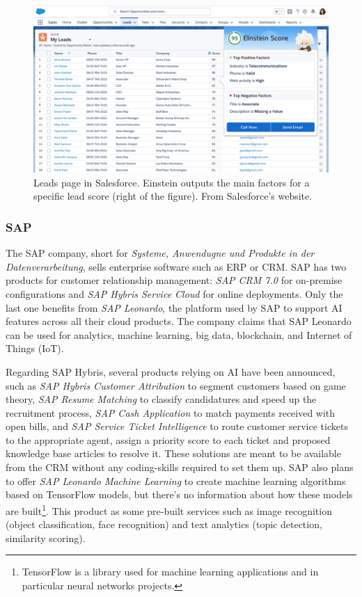 \begin{figure}[h]
    \centering
    \includegraphics[width=13cm]{images/s1.png}
    \caption[Salesforce Einstein for leads scores]{Leads page in Salesforce. Einstein outputs the main factors for a specific lead score (right of the figure). From Salesforce's website.}
    \label{fig:salesforce-leads}
\end{figure}

\subsubsection*{SAP}
The SAP company, short for \textit{Systeme, Anwendugne und Produkte in der Datenverarbeitung}, sells enterprise software such as ERP or CRM. SAP has two products for customer relationship management: \textit{SAP CRM 7.0} for on-premise configurations and \textit{SAP Hybris Service Cloud} for online deployments. Only the last one benefits from \textit{SAP Leonardo}, the platform used by SAP to support AI features across all their cloud products. The company claims that SAP Leonardo can be used for analytics, machine learning, big data, blockchain, and Internet of Things (IoT).

Regarding SAP Hybris, several products relying on AI have been announced, such as \textit{SAP Hybris Customer Attribution} to segment customers based on game theory, \textit{SAP Resume Matching} to classify candidatures and speed up the recruitment process, \textit{SAP Cash Application} to match payments received with open bills, and \textit{SAP Service Ticket Intelligence} to route customer service tickets to the appropriate agent, assign a priority score to each ticket and proposed knowledge base articles to resolve it. These solutions are meant to be available from the CRM without any coding-skills required to set them up. SAP also plans to offer \textit{SAP Leonardo Machine Learning} to create machine learning algorithms based on TensorFlow models, but there's no information about how these models are built\footnote{TensorFlow is a library used for machine learning applications and in particular neural networks projects.}. This product as some pre-built services such as image recognition (object classification, face recognition) and text analytics (topic detection, similarity scoring). 

